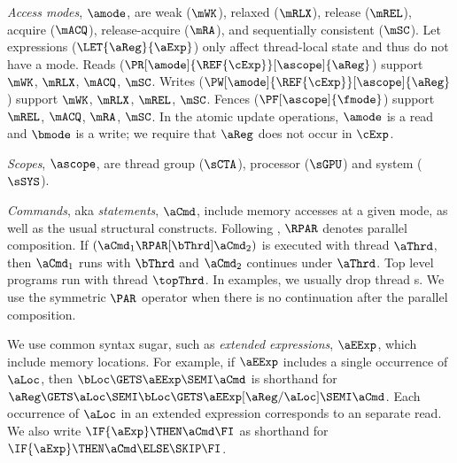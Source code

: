 \emph{Access modes}, $\amode$, are {weak} ($\mWK$), {relaxed} ($\mRLX$),
{release} ($\mREL$), {acquire} ($\mACQ$), {release-acquire} ($\mRA$), and
{sequentially consistent} ($\mSC$).
% 
Let expressions ($\LET{\aReg}{\aExp}$) only affect thread-local state and
thus do not have a mode.
% 
Reads ($\PR[\amode]{\REF{\cExp}}[\ascope]{\aReg}$) support
$\mWK$,
$\mRLX$,
$\mACQ$,
$\mSC$. 
Writes ($\PW[\amode]{\REF{\cExp}}[\ascope]{\aReg}$) support
$\mWK$,
$\mRLX$,
$\mREL$,
$\mSC$. 
Fences ($\PF[\ascope]{\fmode}$) support
$\mREL$,
$\mACQ$,
$\mRA$, 
$\mSC$.
% 
In the atomic update operations, $\amode$ is a read and $\bmode$ is a write;
we require that $\aReg$ does not occur in $\cExp$.

\emph{Scopes}, $\ascope$, are thread group ($\sCTA$), processor ($\sGPU$) and
system ($\sSYS$).

\emph{Commands}, aka \emph{statements}, $\aCmd$, include memory accesses at a
given mode, as well as the usual structural constructs.  Following
\cite{DBLP:conf/icfp/FerreiraHJ96}, $\RPAR$ denotes parallel composition.  If
$(\aCmd_1 \RPAR[\bThrd] \aCmd_2)$ is executed with thread \ID{} $\aThrd$, then
$\aCmd_1$ runs with \ID{} $\bThrd$ and $\aCmd_2$ continues under \ID{} $\aThrd$.
Top level programs run with thread \ID{} $\topThrd$.  In examples, we usually
drop thread \ID{}s.  We use the symmetric $\PAR$ operator when there is no
continuation after the parallel composition.

We use common syntax sugar, such as \emph{extended expressions}, $\aEExp$,
which include memory locations.  For example, if $\aEExp$ includes a single
occurrence of $\aLoc$, then $\bLoc\GETS\aEExp\SEMI \aCmd$ is shorthand for
$\aReg\GETS\aLoc\SEMI\bLoc\GETS\aEExp[\aReg/\aLoc]\SEMI \aCmd$.  Each
occurrence of $\aLoc$ in an extended expression corresponds to an separate
read.  We also write $\IF{\aExp} \THEN \aCmd \FI$ as shorthand for
$\IF{\aExp} \THEN \aCmd\ELSE \SKIP\FI$.



